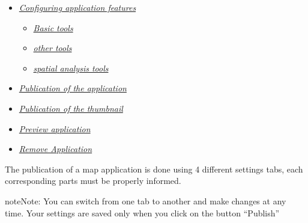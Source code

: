\documentclass[letterpaper,10pt,english]{sphinxmanual}
\begin{document}
{\begin{minipage}{0.95\linewidth}
\begin{itemize}
\begin{itemize}
\item {} 
\label{apps/appconfig:id9}{\hyperref[apps/appconfig:configuration-des-fonctionnalites-de-l-application]{\emph{Configuring application features}}}
\begin{itemize}
\item {} 
\label{apps/appconfig:id10}{\hyperref[apps/appconfig:outils-de-base]{\emph{Basic tools}}}

\item {} 
\label{apps/appconfig:id11}{\hyperref[apps/appconfig:autres-outils]{\emph{other tools}}}

\item {} 
\label{apps/appconfig:id12}{\hyperref[apps/appconfig:outils-d-analyse-spatiale]{\emph{spatial analysis tools}}}

\end{itemize}

\item {} 
\label{apps/appconfig:id13}{\hyperref[apps/appconfig:publication-de-l-application]{\emph{Publication of the application}}}

\item {} 
\label{apps/appconfig:id14}{\hyperref[apps/appconfig:publication-de-la-vignette]{\emph{Publication of the thumbnail}}}

\item {} 
\label{apps/appconfig:id15}{\hyperref[apps/appconfig:previsualisation-de-l-application]{\emph{Preview application}}}

\item {} 
\label{apps/appconfig:id16}{\hyperref[apps/appconfig:supprimer-l-application]{\emph{Remove Application}}}

\end{itemize}

\end{itemize}
\end{minipage}}
\begin{center}\setlength{\fboxsep}{5pt}\end{center}

The publication of a map application is done using 4 different settings tabs, each corresponding parts must be properly informed.

\begin{notice}{note}{Note:}
You can switch from one tab to another and make changes at any time. Your settings are saved only when you click on the button ``Publish''
\end{notice}
\end{document}
